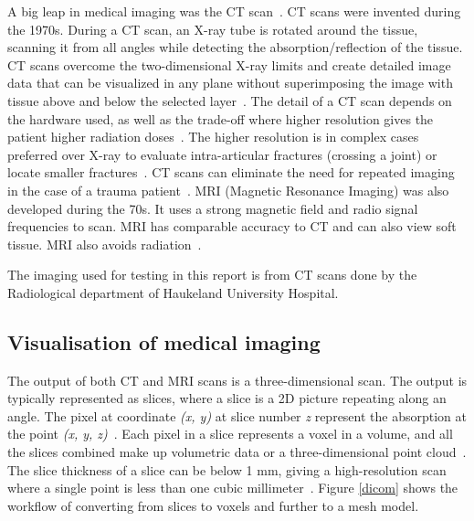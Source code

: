 \documentclass[a4paper]{report}
\begin{document}
A big leap in medical imaging was the CT scan~\cite{bradley_history_2008}.
CT scans were invented during the 1970s. During a CT scan, an X-ray tube is rotated around the tissue, scanning it from all angles while detecting the absorption/reflection of the tissue. CT scans overcome the two-dimensional X-ray limits and create detailed image data that can be visualized in any plane without superimposing the image with tissue above and below the selected layer~\cite{hamblen_outline_2010}. The detail of a CT scan depends on the hardware used, as well as the trade-off where higher resolution gives the patient higher radiation doses~\cite{bradley_history_2008}. The higher resolution is in complex cases preferred over X-ray to evaluate intra-articular fractures (crossing a joint) or locate smaller fractures~\cite{ebnezar_textbook_2016}.
CT scans can eliminate the need for repeated imaging in the case of a trauma patient~\cite{swiontkowski_manual_2013}.
MRI (Magnetic Resonance Imaging) was also developed during the 70s. It uses a strong magnetic field and radio signal frequencies to scan. MRI has comparable accuracy to CT and can also view soft tissue. MRI also avoids radiation~\cite{swiontkowski_manual_2013}.


The imaging used for testing in this report is from CT scans done by the Radiological department of Haukeland University Hospital.

\subsection{Visualisation of medical imaging}


The output of both CT and MRI scans is a three-dimensional scan. The output is typically represented as slices, where a slice is a 2D picture repeating along an angle. The pixel at coordinate \emph{(x, y)} at slice number \emph{z} represent the absorption at the point \emph{(x, y, z)}~\cite{chougule_conversions_2013}.
Each pixel in a slice represents a voxel in a volume, and all the slices combined make up volumetric data or a three-dimensional point cloud~\cite{chougule_conversions_2013}.
The slice thickness of a slice can be below 1 mm, giving a high-resolution scan where a single point is less than one cubic millimeter~\cite{hamblen_outline_2010}. Figure \ref{dicom} shows the workflow of converting from slices to voxels and further to a mesh model.
\end{document}
